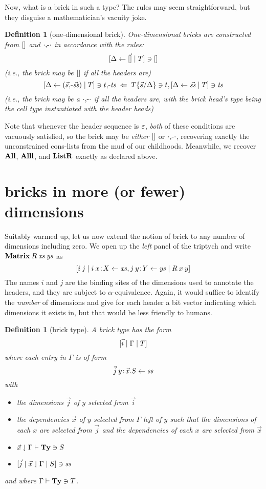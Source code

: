 \documentclass{article}
\newtheorem{defn}[thm]{Definition}
\begin{document}
Now, what is a brick in such a type? The rules may seem straightforward, but they disguise a mathematician's vacuity joke.
\begin{defn}[one-dimensional brick]
  One-dimensional bricks are constructed from $[]$ and $\cdot\mbox{$,\!\textrm{-}$}\cdot$ in accordance with the rules:
  \[
  [\Delta\leftarrow\vec{[]}\;|\; T]\ni[]
  \]
  (i.e., the brick may be $[]$ if all the headers are)
  \[
    [\Delta\leftarrow(\vec s\mbox{$,\!\textrm{-}$}\vec{\mathit{ss}})\;|\; T]\ni t\mbox{$,\!\textrm{-}$}\mathit{ts} \;\Leftarrow\;
    T\{\vec s/\Delta\}\ni t, [\Delta\leftarrow\vec{\mathit{ss}}\;|\; T]\ni \mathit{ts}
  \]
  (i.e., the brick may be a $\cdot\mbox{$,\!\textrm{-}$}\cdot$ if all the headers are, with the brick head's type being the cell type instantiated with the header heads)
\end{defn}
Note that whenever the header sequence is $\varepsilon$, \emph{both} of these conditions are vacuously satisfied, so the brick may be \emph{either} $[]$ or $\cdot\mbox{$,\!\textrm{-}$}\cdot$, recovering exactly the unconstrained cons-lists from the mud of our childhoods. Meanwhile, we recover $\mathbf{All}$, $\mathbf{Alll}$, and $\mathbf{ListR}$ exactly as declared above.


\section{bricks in more (or fewer) dimensions}

Suitably warmed up, let us now extend the notion of brick to any number of dimensions including zero. We open up the \emph{left} panel of the triptych and write $\mathbf{Matrix}\:R\:\mathit{xs}\:\mathit{ys}$ as
\[
[i\: j \;|\; i\: x\!:\! X\leftarrow\mathit{xs}, j\: y\!:\! Y\leftarrow\mathit{ys}\;|\; R\:x\:y]
\]
The names $i$ and $j$ are the binding sites of the dimensions used to annotate the headers, and they are subject to $\alpha$-equivalence. Again, it would suffice to identify the \emph{number} of dimensions and give for each header a bit vector indicating which dimensions it exists in, but that would be less friendly to humans.

\begin{defn}[brick type]
  A brick type has the form
  \[
  [\vec i \;|\; \Gamma \;|\; T]
  \]
  where each entry in $\Gamma$ is of form
  \[
  \vec j\: y\!:\!\vec x.S\leftarrow \mathit{ss}
  \]
  with
  \begin{itemize}
  \item the dimensions $\vec j$ of $y$ selected from $\vec i$
  \item the dependencies $\vec x$ of $y$ selected from $\Gamma$ left of $y$ such that the dimensions of each $x$ are selected from $\vec j$ and the dependencies of each $x$ are selected from $\vec x$
  \item $\vec x\downharpoonleft\Gamma \vdash \mathbf{Ty} \ni S$
  \item $[\vec j\;|\; \vec x\downharpoonleft\Gamma\;|\; S] \ni \mathit{ss}$
  \end{itemize}
  and where $\Gamma\vdash \mathbf{Ty}\ni T$.
\end{defn}
\end{document}
